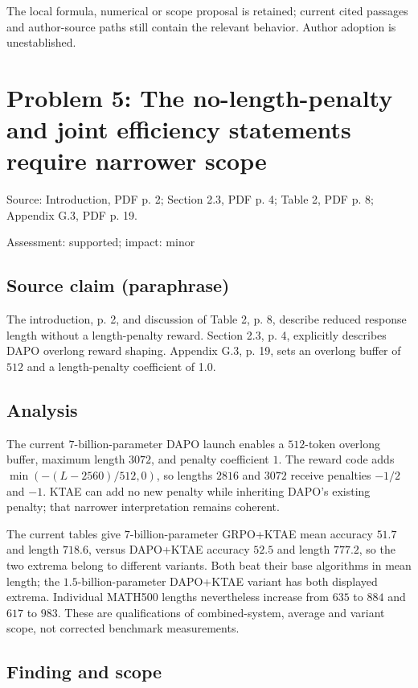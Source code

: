 \documentclass[11pt]{article}
\begin{document}
The local formula, numerical or scope proposal is retained; current cited passages and author-source paths still contain the relevant behavior. Author adoption is unestablished.

\section*{Problem 5: The no-length-penalty and joint efficiency statements require narrower scope}

Source: Introduction, PDF p. 2; Section 2.3, PDF p. 4; Table 2, PDF p. 8; Appendix G.3, PDF p. 19.

Assessment: supported; impact: minor

\subsection*{Source claim (paraphrase)}

The introduction, p. 2, and discussion of Table 2, p. 8, describe reduced response length without a length-penalty reward. Section 2.3, p. 4, explicitly describes DAPO overlong reward shaping. Appendix G.3, p. 19, sets an overlong buffer of \(512\) and a length-penalty coefficient of 1.0.

\subsection*{Analysis}

The current \(7\)-billion-parameter DAPO launch enables a \(512\)-token overlong buffer, maximum length \(3072\), and penalty coefficient \(1\). The reward code adds \(\min(-(L-2560)/512,0)\), so lengths \(2816\) and \(3072\) receive penalties \(-1/2\) and \(-1\). KTAE can add no new penalty while inheriting DAPO’s existing penalty; that narrower interpretation remains coherent.

The current tables give \(7\)-billion-parameter GRPO+KTAE mean accuracy \(51.7\) and length \(718.6\), versus DAPO+KTAE accuracy \(52.5\) and length \(777.2\), so the two extrema belong to different variants. Both beat their base algorithms in mean length; the \(1.5\)-billion-parameter DAPO+KTAE variant has both displayed extrema. Individual MATH500 lengths nevertheless increase from \(635\) to \(884\) and \(617\) to \(983\). These are qualifications of combined-system, average and variant scope, not corrected benchmark measurements.

\subsection*{Finding and scope}
\end{document}
